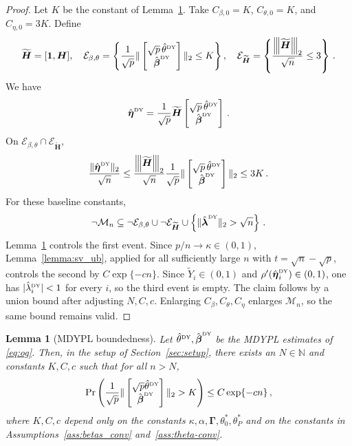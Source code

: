 \documentclass{article}
\makeatletter
\newtheorem{lemma}{Lemma}
\theoremstyle{definition}
\newcommand{\vnorm}[1]{%
	\ensuremath{%
		\if@display
		\left\| #1 \right\|
		\else
		\| #1 \|
		\fi
	}%
}
\newcommand{\abs}[1]{%
	\ensuremath{%
		\if@display
		\left| #1 \right|
		\else
		\lvert #1 \rvert
		\fi
	}%
}
\newcommand{\mnorm}[1]{{\left\vert\kern-0.25ex\left\vert\kern-0.25ex\left\vert #1
		\right\vert\kern-0.25ex\right\vert\kern-0.25ex\right\vert}}
\newcommand*{\bb}{\boldsymbol}
\newcommand{\betady}{\ensuremath{\hat{\bbeta}^{\textrm{\tiny DY}}}}
\newcommand{\etady}{\ensuremath{\hat{\bb{\eta}}^{\textrm{\tiny DY}}}}
\newcommand{\thetady}{\ensuremath{\hat{\theta}^{\textrm{\tiny DY}}}}
\def\bH {\bb{H}}
\def\Ytil{\widetilde{Y}}
\def\bbeta{\bb{\beta}}
\def\bH{\bb{H}}
\def\blambda{\bb{\lambda}}
\makeatother
\begin{document}
\begin{bibunit}
\begin{proof}
Let $K$ be the constant of Lemma~\ref{lemma:boundedness}. Take
$C_{\beta,0}=K$, $C_{\theta,0}=K$, and $C_{\eta,0}=3K$. Define
$$
    \widetilde{\bH}
    =
    [\bb1,\bH],
    \quad
    \mathcal E_{\beta,\theta}
    =
    \left\{
        \frac1{\sqrt p}
        \vnorm{
            \begin{bmatrix}
                \sqrt p\,\thetady\\
                \betady
            \end{bmatrix}
        }_2
        \leq K
    \right\},
    \quad
    \mathcal E_{\widetilde{\bH}}
    =
    \left\{
        \frac{\mnorm{\widetilde{\bH}}_2}{\sqrt n}
        \leq3
    \right\}\,.
$$
We have
$$
    \etady
    =
    \frac1{\sqrt p}
    \widetilde{\bH}
    \begin{bmatrix}
        \sqrt p\,\thetady\\
        \betady
    \end{bmatrix}\,.
$$
On
$\mathcal E_{\beta,\theta}\cap\mathcal E_{\widetilde{\bH}}$,
$$
    \frac{\vnorm{\etady}_2}{\sqrt n}
    \leq
    \frac{\mnorm{\widetilde{\bH}}_2}{\sqrt n}
    \frac1{\sqrt p}
    \vnorm{
        \begin{bmatrix}
            \sqrt p\,\thetady\\
            \betady
        \end{bmatrix}
    }_2
    \leq3K\,.
$$
For these baseline constants,
$$
    \lnot\mathcal M_n
    \subseteq
    \lnot\mathcal E_{\beta,\theta}
    \cup
    \lnot\mathcal E_{\widetilde{\bH}}
    \cup
    \left\{
        \vnorm{\hat{\blambda}^{\textrm{\tiny DY}}}_2
        >
        \sqrt n
    \right\}\,.
$$
Lemma~\ref{lemma:boundedness} controls the first event. Since
$p/n\to\kappa\in(0,1)$, Lemma~\ref{lemma:sv_ub}, applied for all
sufficiently large $n$ with $t=\sqrt n-\sqrt p$, controls the second
by $C\exp\{-cn\}$. Since $\Ytil_i\in(0,1)$ and
$\rho'(\etady_i)\in(0,1)$, one has
$\abs{\hat\lambda_i^{\textrm{\tiny DY}}}<1$ for every $i$, so the
third event is empty. The claim follows by a union bound after adjusting
$N,C,c$. Enlarging $C_\beta,C_\theta,C_\eta$ enlarges $\mathcal M_n$,
so the same bound remains valid.
\end{proof}


\begin{lemma}[MDYPL boundedness] \label{lemma:boundedness}
	Let $\thetady, \betady$ be the MDYPL estimates of \eqref{eq:og}.
	Then, in the setup of Section~\ref{sec:setup}, there exists an $N \in \mathbb{N}$ and constants $K, C, c$ such that
	for all $n > N$,
	\begin{equation}
		\label{eq:mdypl-containment}
		\Pr \left(\frac{1}{\sqrt{p}} \vnorm{\begin{bmatrix}\sqrt{p}\thetady \\ \betady \end{bmatrix}}_2 > K  \right) \leq C \exp\{-c n\} \,,
	\end{equation}
	where $K,C,c$ depend only on the constants $\kappa, \alpha, \bb \Gamma, \theta^*_0, \theta_P^*$ and on the constants in
Assumptions~\ref{ass:betas_conv} and~\ref{ass:theta-conv}.
\end{lemma}


\end{bibunit}
\end{document}
